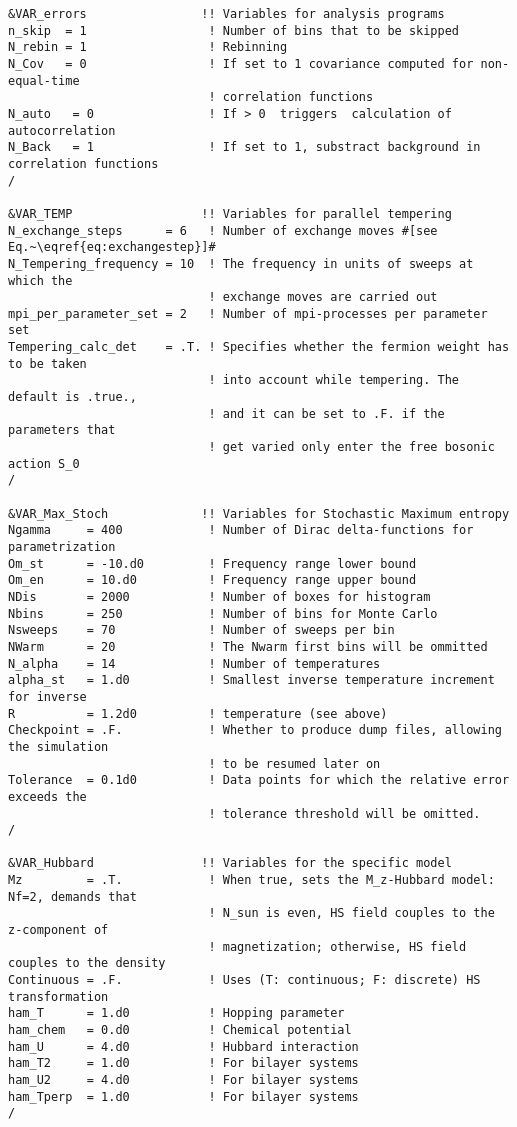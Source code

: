 \begin{lstlisting}[style=fortran,escapechar=\#,breaklines=true]
&VAR_errors                !! Variables for analysis programs
n_skip  = 1                 ! Number of bins that to be skipped
N_rebin = 1                 ! Rebinning  
N_Cov   = 0                 ! If set to 1 covariance computed for non-equal-time
                            ! correlation functions
N_auto   = 0                ! If > 0  triggers  calculation of autocorrelation 
N_Back   = 1                ! If set to 1, substract background in correlation functions
/  

&VAR_TEMP                  !! Variables for parallel tempering
N_exchange_steps      = 6   ! Number of exchange moves #[see Eq.~\eqref{eq:exchangestep}]#
N_Tempering_frequency = 10  ! The frequency in units of sweeps at which the
                            ! exchange moves are carried out
mpi_per_parameter_set = 2   ! Number of mpi-processes per parameter set
Tempering_calc_det    = .T. ! Specifies whether the fermion weight has to be taken
                            ! into account while tempering. The default is .true.,
                            ! and it can be set to .F. if the parameters that
                            ! get varied only enter the free bosonic action S_0
/

&VAR_Max_Stoch             !! Variables for Stochastic Maximum entropy
Ngamma     = 400            ! Number of Dirac delta-functions for parametrization
Om_st      = -10.d0         ! Frequency range lower bound
Om_en      = 10.d0          ! Frequency range upper bound
NDis       = 2000           ! Number of boxes for histogram
Nbins      = 250            ! Number of bins for Monte Carlo
Nsweeps    = 70             ! Number of sweeps per bin
NWarm      = 20             ! The Nwarm first bins will be ommitted
N_alpha    = 14             ! Number of temperatures
alpha_st   = 1.d0           ! Smallest inverse temperature increment for inverse
R          = 1.2d0          ! temperature (see above) 
Checkpoint = .F.            ! Whether to produce dump files, allowing the simulation
                            ! to be resumed later on
Tolerance  = 0.1d0          ! Data points for which the relative error exceeds the
                            ! tolerance threshold will be omitted.
/

&VAR_Hubbard               !! Variables for the specific model
Mz         = .T.            ! When true, sets the M_z-Hubbard model: Nf=2, demands that
                            ! N_sun is even, HS field couples to the z-component of
                            ! magnetization; otherwise, HS field couples to the density
Continuous = .F.            ! Uses (T: continuous; F: discrete) HS transformation
ham_T      = 1.d0           ! Hopping parameter
ham_chem   = 0.d0           ! Chemical potential
ham_U      = 4.d0           ! Hubbard interaction
ham_T2     = 1.d0           ! For bilayer systems
ham_U2     = 4.d0           ! For bilayer systems
ham_Tperp  = 1.d0           ! For bilayer systems
/
               
\end{lstlisting}
%
\FloatBarrier

